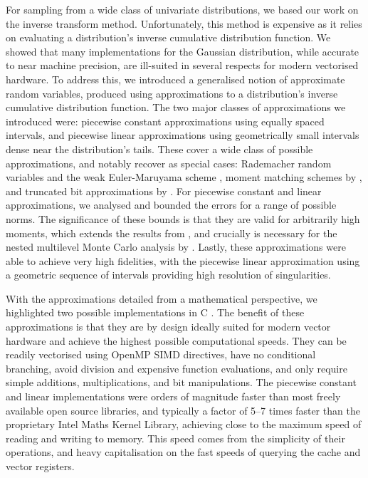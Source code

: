 \documentclass[9pt,a4paper,english]{extarticle}
\begin{document}
For sampling from a wide class of univariate distributions, we based our work on the inverse transform method. Unfortunately, this method is expensive as it relies on evaluating a distribution's inverse cumulative distribution function. We showed that many implementations for the Gaussian distribution, while accurate to near machine precision, are ill-suited in several respects for modern vectorised hardware. To address this, we introduced a generalised notion of approximate random variables, produced using approximations to a distribution's inverse cumulative distribution function. The two major classes of approximations we introduced were: piecewise constant approximations using equally spaced intervals, and piecewise linear approximations using geometrically small intervals dense near the distribution's tails. These cover a wide class of possible approximations, and notably recover as special cases: Rademacher random variables and the weak Euler-Maruyama scheme \citep{glasserman2013monte}, moment matching schemes by \citet{muller2015improving}, and truncated bit approximations by \citet{giles2019random_quadrature}. For piecewise constant and linear approximations, we analysed and bounded the errors for a range of possible norms. The significance of these bounds is that they are valid for arbitrarily high moments, which extends the results from \citet{giles2019random_quadrature}, and crucially is necessary for the nested multilevel Monte Carlo analysis by \citet{giles2020approximate}. Lastly, these approximations were able to achieve very high fidelities, with the piecewise linear approximation using a geometric sequence of intervals providing high resolution of singularities.

With the approximations detailed from a mathematical perspective, we highlighted two possible implementations in C \citep{sheridan2020approximate_random}. The benefit of these approximations is that they are by design ideally suited for modern vector hardware and achieve the highest possible computational speeds. They can be readily vectorised using OpenMP SIMD directives, have no conditional branching, avoid division and expensive function evaluations, and only require simple additions, multiplications, and bit manipulations. The piecewise constant and linear implementations were orders of magnitude faster than most freely available open source libraries, and typically a factor of 5--7 times faster than the proprietary Intel Maths Kernel Library, achieving close to the maximum speed of reading and writing to memory. This speed comes from the simplicity of their operations, and heavy capitalisation on the fast speeds of querying the cache and vector registers. 
\end{document}
